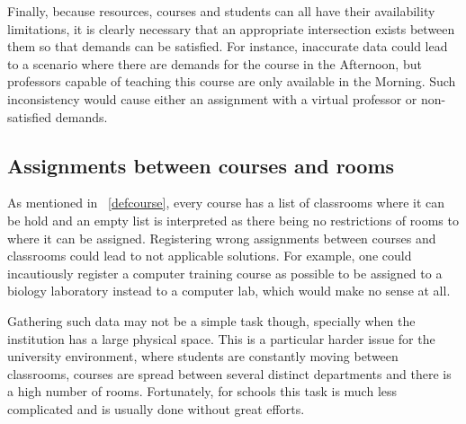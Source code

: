 Finally, because resources, courses and students can all have their availability limitations, it is clearly necessary that an appropriate intersection exists between them so that demands can be satisfied. For instance, inaccurate data could lead to a scenario where there are demands for the course  in the Afternoon, but professors capable of teaching this course are only available in the Morning. Such inconsistency would cause either an assignment with a virtual professor or non-satisfied demands.


\subsection{Assignments between courses and rooms}

As mentioned in ~\ref{defcourse}, every course has a list of classrooms where it can be hold and an empty list is interpreted as there being no restrictions of rooms to where it can be assigned. Registering wrong assignments between courses and classrooms could lead to not applicable solutions. For example, one could incautiously register a computer training course as possible to be assigned to a biology laboratory instead to a computer lab, which would make no sense at all.

Gathering such data may not be a simple task though, specially when the institution has a large physical space. This is a particular harder issue for the university environment, where students are constantly moving between classrooms, courses are spread between several distinct departments and there is a high number of rooms. Fortunately, for schools this task is much less complicated and is usually done without great efforts.




